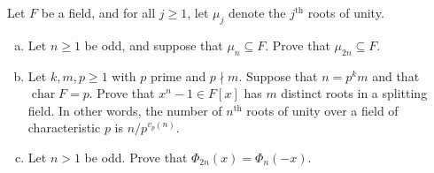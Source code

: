 \documentclass[10pt]{amsart}
\begin{document}
\begin{thm}
  Let $F$ be a field, and for all $j \geq 1$, let $\mu_j$ denote the $j^\text{th}$ roots of unity.
  \begin{enumerate}[(a)]
    \item
      Let $n \geq 1$ be odd, and suppose that $\mu_n \subseteq F$.
      Prove that $\mu_{2n} \subseteq F$.
    \item
      Let $k, m, p \geq 1$ with $p$ prime and $p \nmid m$.
      Suppose that $n = p^km$ and that $\operatorname{char} F = p$.
      Prove that $x^n - 1 \in F[x]$ has $m$ distinct roots in a splitting field.
      In other words, the number of $n^\text{th}$ roots of unity over a field of characteristic $p$ is $n/p^{v_p(n)}$.
    \item
      Let $n > 1$ be odd.
      Prove that $\Phi_{2n}(x) = \Phi_n(-x)$.
  \end{enumerate}


\end{thm}
\end{document}
